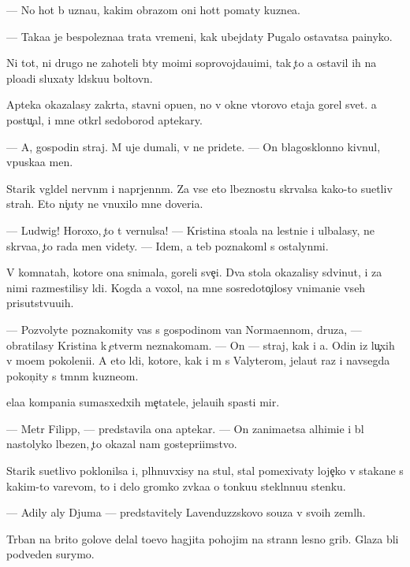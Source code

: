 \documentclass[10pt]{book}
\begin{document}
— No hot{\ia} b{\yi} uzna{\y}u, kakim obrazom oni hot{\ia}t po{\y}maty kuzne{\q}a.

— Taka{\y}a je bespolezna{\y}a trata vremeni, kak ubejdaty Pugalo ostavatsa pa{\y}inyko{\y}.

Ni tot, ni drugo{\y} ne zahoteli b{\yi}ty mo{\y}imi soprovojda{\y}u{\x}imi, tak {\c}to {\y}a ostavil ih na plo{\x}adi sluxaty l{\iu}dsku{\y}u boltovn{\iu}.

Apteka okazalasy zakr{\yi}ta, stavni opu{\x}en{\yi}, no v okne vtorovo etaja gorel svet. {\Y}a postu{\c}al, i mne otkr{\yi}l sedoborod{\yi}{\y} aptekary.

— A, gospodin straj. M{\yi} uje dumali, v{\yi} ne pridete. — On blagosklonno kivnul, vpuska{\y}a men{\ia}.

Starik v{\yi}gl{\ia}del nervn{\yi}m i napr{\ia}jenn{\yi}m. Za vse{\y} eto{\y} l{\iu}beznost{\y}u skr{\yi}valsa kako{\y}-to su{\y}etliv{\yi}{\y} strah. Eto ni{\c}uty ne vnuxilo mne doveri{\y}a.

— Ludwig! Horoxo, {\c}to t{\yi} vernulsa! — Kristina sto{\y}ala na lestni{\q}e i ul{\yi}balasy, ne skr{\yi}va{\y}a, {\c}to rada men{\ia} videty. — Idem, {\y}a teb{\ia} poznakoml{\iu} s ostalyn{\yi}mi.

V komnatah, kotor{\yi}{\y}e ona snimala, goreli sve{\c}i. Dva stola okazalisy sdvinut{\yi}, i za nimi razmestilisy l{\iu}di. Kogda {\y}a  voxol, na mne sosredoto{\c}ilosy vnimani{\y}e vseh prisutstvu{\y}u{\x}ih.

— Pozvolyte poznakomity vas s gospodinom van Norma{\y}ennom, druz{\y}a, — obratilasy Kristina k {\c}etver{\yi}m neznakom{\q}am. — On — straj, kak i {\y}a. Odin iz lu{\c}xih v mo{\y}em pokoleni{\y}i. A eto l{\iu}di, kotor{\yi}{\y}e, kak i m{\yi} s Valyterom, jela{\y}ut raz i navsegda pokon{\c}ity s t{\e}mn{\yi}m kuzne{\q}om.

{\Q}ela{\y}a kompani{\y}a sumasxedxih me{\c}tatele{\y}, jela{\y}u{\x}ih spasti mir.

— Metr Filipp, — predstavila ona aptekar{\ia}. — On zanima{\y}etsa alhimi{\y}e{\y} i b{\yi}l nastolyko l{\iu}bezen, {\c}to okazal nam gostepri{\y}imstvo.

Starik su{\y}etlivo poklonilsa i, pl{\iu}hnuvxisy na stul, stal pomexivaty loje{\c}ko{\y} v stakane s kakim-to varevom, to i delo gromko zv{\ia}ka{\y}a o tonku{\y}u stekl{\ia}nnu{\y}u stenku.

— Adily aly Djuma — predstavitely Lavenduzzskovo so{\y}uza v svo{\y}ih zeml{\ia}h.

T{\iu}rban na brito{\y} golove delal to{\x}evo hagjita pohojim na strann{\yi}{\y} lesno{\y} grib. Glaza b{\yi}li podveden{\yi} surymo{\y}.
\end{document}
